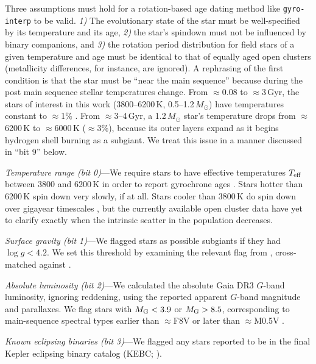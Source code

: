 \documentclass[11pt,twocolumn,tighten]{aastex63}
\begin{document}
Three assumptions must hold for a rotation-based age dating method
like \texttt{gyro-interp} to be valid.  {\it 1)} The evolutionary
state of the star must be well-specified by its temperature and its
age, {\it 2)} the star's spindown must not be influenced by binary
companions, and {\it 3)} the rotation period distribution for field
stars of a given temperature and age must be identical to that of
equally aged open clusters (metallicity differences, for instance, are
ignored).  A rephrasing of the first condition is that the star must
be ``near the main sequence'' because during the post main sequence
stellar temperatures change.  From $\approx$0.08 to $\approx$3\,Gyr,
the stars of interest in this work (3800--6200\,K,
0.5--1.2\,$M_\odot$) have temperatures constant to $\approx$1\%
\citep{Choi_2016}.  From $\approx$3--4\,Gyr, a 1.2\,$M_\odot$ star's
temperature drops from $\approx$6200\,K to $\approx$6000\,K
($\approx$3\%), because its outer layers expand as it begins hydrogen
shell burning as a subgiant.  We treat this issue in a manner
discussed in ``bit 9'' below.

{\it Temperature range (bit 0)}---We require stars to have effective
temperatures $T_{\rm eff}$ between 3800 and 6200\,K in order to report
gyrochrone ages \citep{Bouma_2023}.   Stars hotter than 6200\,K spin
down very slowly, if at all.  Stars cooler than 3800\,K do spin down
over gigayear timescales
\citep{2016ApJ...821...93N,2023ApJ...954L..50E,2024arXiv240312129C},
but the currently available open cluster data have yet to clarify
exactly when the intrinsic scatter in the population decreases.

{\it Surface gravity (bit 1)}---We flagged stars as possible subgiants
if they had $\log g < 4.2$.  We set this threshold by examining the
relevant flag from \citet{berger_2018_radii_evolnstates},
cross-matched against \citet{Berger_2020a_catalog}.

{\it Absolute luminosity (bit 2)}---We calculated the absolute Gaia
DR3 $G$-band luminosity, ignoring reddening, using the reported
apparent $G$-band magnitude and parallaxes.  We flag stars with
$M_{\rm G} < 3.9$ or $M_{\rm G} > 8.5$, corresponding to main-sequence
spectral types earlier than $\approx$F8V or later than $\approx$M0.5V
\citep{Pecaut_2013}.

{\it Known eclipsing binaries (bit 3)}---We flagged any stars reported
to be in the final Kepler eclipsing binary catalog (KEBC;
\citealt{2016AJ....151...68K}).
\end{document}
